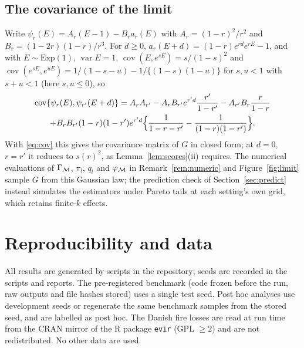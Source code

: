 \subsection{The covariance of the limit}\label{app:cov}

Write $\psi_r(E)=A_r(E-1)-B_ra_r(E)$ with $A_r=(1-r)^2/r^2$ and $B_r=(1-2r)(1-r)/r^3$. For $d\ge0$,
$a_r(E+d)=(1-r)e^{rd}e^{rE}-1$, and with $E\sim\mathrm{Exp}(1)$, $\operatorname{var}E=1$,
$\operatorname{cov}(E,e^{sE})=s/(1-s)^2$ and
$\operatorname{cov}(e^{sE},e^{uE})=1/(1-s-u)-1/\{(1-s)(1-u)\}$ for $s,u<1$ with $s+u<1$ (here $s,u\le0$), so
\begin{multline*}
\operatorname{cov}\{\psi_r(E),\psi_{r'}(E+d)\}=A_rA_{r'}-A_rB_{r'}e^{r'd}\frac{r'}{1-r'}
-A_{r'}B_r\frac{r}{1-r}\\
+B_rB_{r'}(1-r)(1-r')e^{r'd}\Bigl\{\frac1{1-r-r'}-\frac1{(1-r)(1-r')}\Bigr\}.
\end{multline*}
With \eqref{eq:cov} this gives the covariance matrix of $G$ in closed form; at $d=0$, $r=r'$ it
reduces to $s(r)^2$, as Lemma~\ref{lem:scores}(ii) requires. The numerical evaluations of
$\Gamma_{\mathcal{M}}$, $\pi_l$, $q_l$ and $\varphi_{\mathcal{M}}$ in Remark~\ref{rem:numeric} and
Figure~\ref{fig:limit} sample $G$ from this Gaussian law; the prediction check of
Section~\ref{sec:predict} instead simulates the estimators under Pareto tails at each setting's own
grid, which retains finite-$k$ effects.

\section{Reproducibility and data}\label{app:repro}

All results are generated by scripts in the repository; seeds are recorded in the scripts and
reports. The pre-registered benchmark (code frozen before the run, raw outputs and file hashes
stored) uses a single test seed. Post hoc analyses use development seeds or regenerate the
same benchmark samples from the stored seed, and are labelled as post hoc. The Danish fire
losses are read at run time from the CRAN mirror of the R package \texttt{evir} (GPL $\ge2$) and
are not redistributed. No other data are used.

